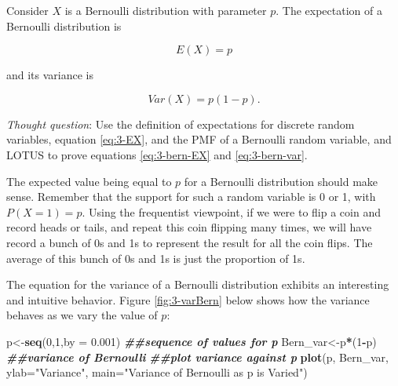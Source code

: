 \documentclass[
]{book}
\newenvironment{Shaded}{\begin{snugshade}}{\end{snugshade}}
\newcommand{\AttributeTok}[1]{\textcolor[rgb]{0.13,0.29,0.53}{#1}}
\newcommand{\DecValTok}[1]{\textcolor[rgb]{0.00,0.00,0.81}{#1}}
\newcommand{\DocumentationTok}[1]{\textcolor[rgb]{0.56,0.35,0.01}{\textbf{\textit{#1}}}}
\newcommand{\FloatTok}[1]{\textcolor[rgb]{0.00,0.00,0.81}{#1}}
\newcommand{\FunctionTok}[1]{\textcolor[rgb]{0.13,0.29,0.53}{\textbf{#1}}}
\newcommand{\NormalTok}[1]{#1}
\newcommand{\OtherTok}[1]{\textcolor[rgb]{0.56,0.35,0.01}{#1}}
\newcommand{\SpecialCharTok}[1]{\textcolor[rgb]{0.81,0.36,0.00}{\textbf{#1}}}
\newcommand{\StringTok}[1]{\textcolor[rgb]{0.31,0.60,0.02}{#1}}
\begin{document}
Consider \(X\) is a Bernoulli distribution with parameter \(p\). The expectation of a Bernoulli distribution is

\begin{equation} 
E(X) = p
\label{eq:3-bern-EX}
\end{equation}

and its variance is

\begin{equation} 
Var(X) = p(1-p).
\label{eq:3-bern-var}
\end{equation}

\emph{Thought question}: Use the definition of expectations for discrete random variables, equation \eqref{eq:3-EX}, and the PMF of a Bernoulli random variable, and LOTUS to prove equations \eqref{eq:3-bern-EX} and \eqref{eq:3-bern-var}.

The expected value being equal to \(p\) for a Bernoulli distribution should make sense. Remember that the support for such a random variable is 0 or 1, with \(P(X=1) = p\). Using the frequentist viewpoint, if we were to flip a coin and record heads or tails, and repeat this coin flipping many times, we will have record a bunch of 0s and 1s to represent the result for all the coin flips. The average of this bunch of 0s and 1s is just the proportion of 1s.

The equation for the variance of a Bernoulli distribution exhibits an interesting and intuitive behavior. Figure \ref{fig:3-varBern} below shows how the variance behaves as we vary the value of \(p\):

\begin{Shaded}
\begin{Highlighting}[]
\NormalTok{p}\OtherTok{\textless{}{-}}\FunctionTok{seq}\NormalTok{(}\DecValTok{0}\NormalTok{,}\DecValTok{1}\NormalTok{,}\AttributeTok{by =} \FloatTok{0.001}\NormalTok{) }\DocumentationTok{\#\#sequence of values for p}
\NormalTok{Bern\_var}\OtherTok{\textless{}{-}}\NormalTok{p}\SpecialCharTok{*}\NormalTok{(}\DecValTok{1}\SpecialCharTok{{-}}\NormalTok{p) }\DocumentationTok{\#\#variance of Bernoulli}
\DocumentationTok{\#\#plot variance against p}
\FunctionTok{plot}\NormalTok{(p, Bern\_var, }\AttributeTok{ylab=}\StringTok{"Variance"}\NormalTok{, }\AttributeTok{main=}\StringTok{"Variance of Bernoulli as p is Varied"}\NormalTok{)}
\end{Highlighting}
\end{Shaded}
\end{document}
